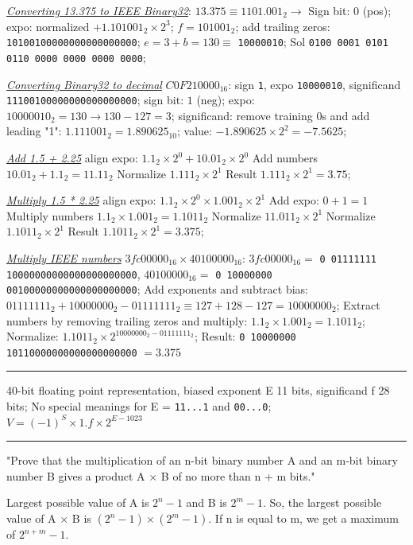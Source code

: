 \documentclass[a4paper]{article}
\begin{document}
\begin{multicols*}{2}
  \underline{\textit{Converting 13.375 to IEEE Binary32}}: $13.375 \equiv 1101.001_2 \to$ Sign bit: $0$ (pos); expo: normalized $+1.101001_2 \times 2^3$; $f=101001_2$; add trailing zeros: \texttt{10100100000000000000000}; $e=3+b=130\equiv$ \texttt{10000010}; Sol \texttt{0100 0001 0101 0110 0000 0000 0000 0000};

  \underline{\textit{Converting Binary32 to decimal}} $C0F210000_{16}$: sign \texttt{1}, expo \texttt{10000010}, significand \texttt{11100100000000000000000}; sign bit: $1$ (neg); expo: $10000010_2=130\to 130-127=3$; significand: remove training 0s and add leading "1": $1.111001_2=1.890625_{10}$; value: $-1.890625 \times 2^2 = -7.5625$;

  \underline{\textit{Add 1.5 + 2.25}} align expo: $1.1_2 \times 2^0 + 10.01_2 \times 2^0$ Add numbers $10.01_2 + 1.1_2 = 11.11_2$ Normalize $1.111_2 \times 2^1$ Result $1.111_2 \times 2^1 = 3.75$;

  \underline{\textit{Multiply 1.5 * 2.25}} align expo: $1.1_2 \times 2^0 \times 1.001_2 \times 2^1$ Add expo: $0+1=1$ Multiply numbers $1.1_2 \times 1.001_2 = 1.1011_2$ Normalize $11.011_2 \times 2^1$ Normalize $1.1011_2 \times 2^1$ Result $1.1011_2 \times 2^1 = 3.375$;

  \underline{\textit{Multiply IEEE numbers}} $3fc00000_{16} \times 40100000_{16}$: $3fc00000_{16} =$ \texttt{0 01111111 10000000000000000000000}, $40100000_{16} =$ \texttt{0 10000000 00100000000000000000000}; Add exponents and subtract bias: $01111111_2 + 10000000_2 - 01111111_2 \equiv 127 + 128 - 127 = 10000000_2$; Extract numbers by removing trailing zeros and multiply: $1.1_2 \times 1.001_2 = 1.1011_2$; Normalize: $1.1011_2 \times 2^{10000000_2 - 01111111_2}$; Result: \texttt{0 10000000 10110000000000000000000} $=3.375$

  \rule{1\linewidth}{0.4pt}

  40-bit floating point representation, biased exponent E 11 bits, significand f 28 bits; No special meanings for E = \texttt{11...1} and \texttt{00...0}; $V = (-1)^{S} \times 1.f \times 2^{E - 1023}$

  \rule{1\linewidth}{0.4pt}

  "Prove that the multiplication of an n-bit binary number A and an m-bit binary number B gives a product A $\times$ B of no more than n + m bits."

  Largest possible value of A is $2^n - 1$ and B is $2^m - 1$. So, the largest possible value of A $\times$ B is $(2^n - 1) \times (2^m - 1)$. If n is equal to m, we get a maximum of $2^{n+m} - 1$.


\end{multicols*}
\end{document}

